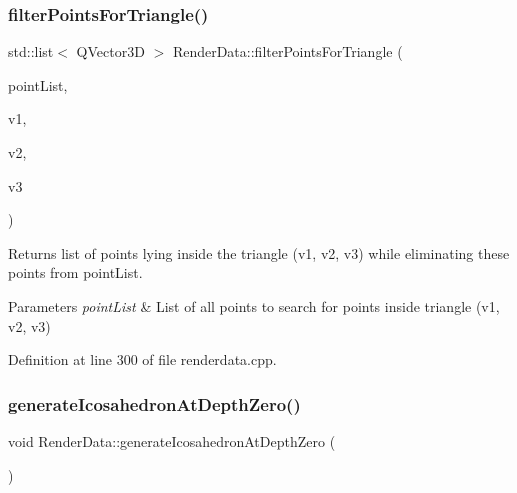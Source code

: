 \subsubsection{\texorpdfstring{filter\+Points\+For\+Triangle()}{filterPointsForTriangle()}}
{\footnotesize\ttfamily std\+::list$<$ Q\+Vector3D $>$ Render\+Data\+::filter\+Points\+For\+Triangle (\begin{DoxyParamCaption}\item[{std\+::list$<$ Q\+Vector3D $>$ \&}]{point\+List,  }\item[{float $\ast$}]{v1,  }\item[{float $\ast$}]{v2,  }\item[{float $\ast$}]{v3 }\end{DoxyParamCaption})\hspace{0.3cm}{\ttfamily [private]}}

\begin{DoxyReturn}{Returns}
list of points lying \textquotesingle{}inside\textquotesingle{} the triangle (v1, v2, v3) while eliminating these points from point\+List. 
\end{DoxyReturn}

\begin{DoxyParams}{Parameters}
{\em point\+List} & List of all points to search for points \textquotesingle{}inside\textquotesingle{} triangle (v1, v2, v3) \\
\hline
\end{DoxyParams}


Definition at line 300 of file renderdata.\+cpp.

\mbox{\label{class_render_data_adee024bdbedaae2cfd38bb2038b4aa48}} 
\subsubsection{\texorpdfstring{generate\+Icosahedron\+At\+Depth\+Zero()}{generateIcosahedronAtDepthZero()}}
{\footnotesize\ttfamily void Render\+Data\+::generate\+Icosahedron\+At\+Depth\+Zero (\begin{DoxyParamCaption}{ }\end{DoxyParamCaption})\hspace{0.3cm}{\ttfamily [private]}}

